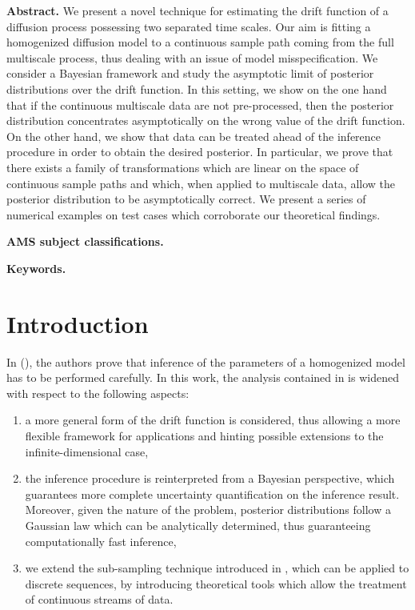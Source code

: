 \documentclass[10pt]{article}
\begin{document}
\maketitle	

\textbf{Abstract.}  We present a novel technique for estimating the drift function of a diffusion process possessing two separated time scales. Our aim is fitting a homogenized diffusion model to a continuous sample path coming from the full multiscale process, thus dealing with an issue of model misspecification. We consider a Bayesian framework and study the asymptotic limit of posterior distributions over the drift function. In this setting, we show on the one hand that if the continuous multiscale data are not pre-processed, then the posterior distribution concentrates asymptotically on the wrong value of the drift function. On the other hand, we show that data can be treated ahead of the inference procedure in order to obtain the desired posterior. In particular, we prove that there exists a family of transformations which are linear on the space of continuous sample paths and which, when applied to multiscale data, allow the posterior distribution to be asymptotically correct. We present a series of numerical examples on test cases which corroborate our theoretical findings.
 
\textbf{AMS subject classifications.} 

\textbf{Keywords.} 

\section{Introduction}

In \cite{PaS07} (), the authors prove that inference of the parameters of a homogenized model has to be performed carefully. In this work, the analysis contained in \cite{PaS07} is widened with respect to the following aspects:
\begin{enumerate}[label=\arabic*)]
	\item a more general form of the drift function is considered, thus allowing a more flexible framework for applications and hinting possible extensions to the infinite-dimensional case,
	\item the inference procedure is reinterpreted from a Bayesian perspective, which guarantees more complete uncertainty quantification on the inference result. Moreover, given the nature of the problem, posterior distributions follow a Gaussian law which can be analytically determined, thus guaranteeing computationally fast inference,
	\item we extend the sub-sampling technique introduced in \cite{PaS07}, which can be applied to discrete sequences, by introducing theoretical tools which allow the treatment of continuous streams of data.
\end{enumerate}
\end{document}
